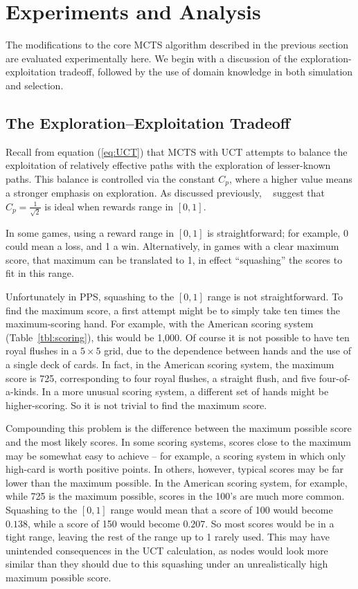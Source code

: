 \documentclass[letterpaper]{article}
\begin{document}
\section{Experiments and Analysis}

The modifications to the core MCTS algorithm described in the previous section are evaluated experimentally here. We begin with a discussion of the exploration-exploitation tradeoff, followed by the use of domain knowledge in both simulation and selection.

\subsection{The Exploration--Exploitation Tradeoff}
Recall from equation (\ref{eq:UCT}) that MCTS with UCT attempts to balance the exploitation of relatively effective paths with the exploration of lesser-known paths. This balance is controlled via the constant $C_p$, where a higher value means a stronger emphasis on exploration. As discussed previously, ~\cite{kocsis2006improved} suggest that $C_p=\frac{1}{\sqrt{2}}$ is ideal when rewards range in $[0,1]$. 

In some games, using a reward range in $[0,1]$ is straightforward; for example, 0 could mean a loss, and 1 a win. Alternatively, in games with a clear maximum score, that maximum can be translated to 1, in effect ``squashing'' the scores to fit in this range.

Unfortunately in PPS, squashing to the $[0,1]$ range is not straightforward. To find the maximum score, a first attempt might be to simply take ten times the maximum-scoring hand. For example, with the American scoring system (Table~\ref{tbl:scoring}), this would be 1,000. Of course it is not possible to have ten royal flushes in a $5\times5$ grid, due to the dependence between hands and the use of a single deck of cards. In fact, in the American scoring system, the maximum score is 725, corresponding to four royal flushes, a straight flush, and five four-of-a-kinds. In a more unusual scoring system, a different set of hands might be higher-scoring. So it is not trivial to find the maximum score.

Compounding this problem is the difference between the maximum possible score and the most likely scores. In some scoring systems, scores close to the maximum may be somewhat easy to achieve -- for example, a scoring system in which only high-card is worth positive points. In others, however, typical scores may be far lower than the maximum possible. In the American scoring system, for example, while 725 is the maximum possible, scores in the 100's are much more common. Squashing to the $[0,1]$ range would mean that a score of 100 would become $0.138$, while a score of 150 would become $0.207$. So most scores would be in a tight range, leaving the rest of the range up to 1 rarely used. This may have unintended consequences in the UCT calculation, as nodes would look more similar than they should due to this squashing under an unrealistically high maximum possible score.
\end{document}
